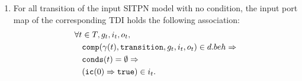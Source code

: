 \begin{definition}
\begin{enumerate}
  \item For all transition of the input SITPN model with no condition, the input port map of the corresponding TDI holds the following association:\\
    \begin{equation*}
      \begin{aligned}[t]
        \forall{}t&\in{}T,g_t,i_t,o_t, \\
                  & \mathtt{comp}(\gamma(t),\mathtt{transition},g_t,i_t,o_t)\in{}d.beh\Rightarrow \\
                  & \mathtt{conds}(t)=\emptyset\Rightarrow \\
                  & (\mathtt{ic}(0)\Rightarrow\mathtt{true})\in{}i_t. \\
      \end{aligned}
    \end{equation*}
  \end{enumerate}

\end{definition}


